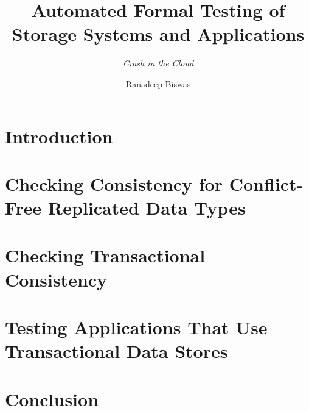\documentclass{mimosis}
\title{Automated Formal Testing of Storage Systems and Applications}
\subtitle{\emph{Crash in the Cloud}}
\author{Ranadeep Biswas}
\begin{document}
\frontmatter  
  
  


  \tableofcontents

\mainmatter

  \chapter{Introduction}

  

  \chapter{Checking Consistency for Conflict-Free Replicated Data Types}
  \label{chap:crdt}

  
  
  
  
  
  
  
  

  \chapter{Checking Transactional Consistency}
  \label{chap:txn}

  
%  
  
  
  
  
  

  \chapter{Testing Applications That Use Transactional Data Stores}
  \label{chap:dist-app}

  
  
  
  
  
  
  
  
  

  \chapter{Conclusion}
  \label{chap:conclusion}
  

\backmatter


  \printindex
  \printbibliography
\end{document}

